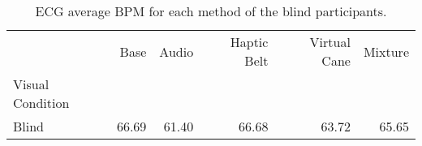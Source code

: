 
\begin{table}[!htb]
\centering
\caption{ECG average BPM  for each method of the blind participants.}
\label{tab:bpm_average_group_blind}
\begin{tabular}{lrrrrr}
\toprule
{} &   Base &  Audio & Haptic Belt & Virtual Cane & Mixture \\
Visual Condition &        &        &             &              &         \\
\midrule
Blind            &  66.69 &  61.40 &       66.68 &        63.72 &   65.65 \\
\bottomrule
\end{tabular}
\end{table}

